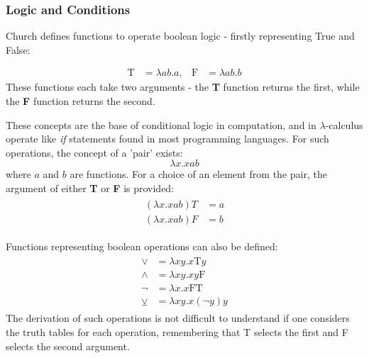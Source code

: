 \documentclass[Master.tex]{subfiles}
\begin{document}
\subsubsection{Logic and Conditions}

Church defines functions to operate boolean logic - firstly representing True and False:
    
\begin{equation*}
\begin{aligned}
\bm{\mathrm{T}} &= \lambda ab.a,
  & %
\bm{\mathrm{F}} &= \lambda ab.b
\end{aligned}
\end{equation*}
These functions each take two arguments - the \textbf{T} function returns the first, while the \textbf{F} function returns the second.

These concepts are the base of conditional logic in computation, and in $\lambda$-calculus operate like \textit{if} statements found in most programming languages. For such operations, the concept of a 'pair' exists:
\begin{equation*}
\lambda x.xab
\end{equation*}
where $a$ and $b$ are functions. For a choice of an element from the pair, the argument of either \textbf{T} or \textbf{F} is provided:
\begin{gather*}
\begin{aligned}
(\lambda x.xab)T &= a\\
(\lambda x.xab)F &= b
\end{aligned}
\end{gather*}

Functions representing boolean operations can also be defined:
\begin{gather*}
\begin{aligned}
\vee &= \lambda xy.x\bm{\mathrm{T}}y\\
\wedge &= \lambda xy.xy\bm{\mathrm{F}}\\
\lnot &= \lambda x.x\bm{\mathrm{FT}} \\
\veebar &= \lambda xy.x(\lnot y)y
\end{aligned}
\end{gather*}
The derivation of such operations is not difficult to understand if one considers the truth tables for each operation, remembering that T selects the first and F selects the second argument.
\end{document}
